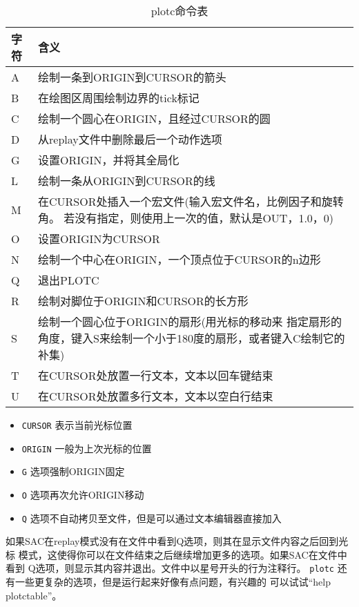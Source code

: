 \begin{table}[!ht]
\centering
\ttfamily
\small
\caption{plotc命令表}
\begin{tabular}{p{1cm}p{10cm}}
	\toprule
	字符	& 	含义	\\
	\midrule
	A		&	绘制一条到ORIGIN到CURSOR的箭头	\\
	B		&	在绘图区周围绘制边界的tick标记  \\
	C		&	绘制一个圆心在ORIGIN，且经过CURSOR的圆	\\
	D		&	从replay文件中删除最后一个动作选项	\\
	G		&	设置ORIGIN，并将其全局化	\\
	L		& 	绘制一条从ORIGIN到CURSOR的线	\\
	M		&	在CURSOR处插入一个宏文件(输入宏文件名，比例因子和旋转角。
                若没有指定，则使用上一次的值，默认是OUT，1.0，0)\\
	O		&	设置ORIGIN为CURSOR		\\
	N		&	绘制一个中心在ORIGIN，一个顶点位于CURSOR的n边形 \\
	Q		&	退出PLOTC	\\
	R		&	绘制对脚位于ORIGIN和CURSOR的长方形	\\
	S		&	绘制一个圆心位于ORIGIN的扇形(用光标的移动来
                指定扇形的角度，键入S来绘制一个小于180度的扇形，或者键入C绘制它的补集)\\
	T		&	在CURSOR处放置一行文本，文本以回车键结束	\\
	U		&	在CURSOR处放置多行文本，文本以空白行结束	\\
	\bottomrule
\end{tabular}
\end{table}
\begin{itemize}
\item \texttt{CURSOR} 表示当前光标位置
\item \texttt{ORIGIN} 一般为上次光标的位置
\item \texttt{G} 选项强制ORIGIN固定
\item \texttt{O} 选项再次允许ORIGIN移动
\item \texttt{Q} 选项不自动拷贝至文件，但是可以通过文本编辑器直接加入
\end{itemize}
如果SAC在replay模式没有在文件中看到Q选项，则其在显示文件内容之后回到光标
模式，这使得你可以在文件结束之后继续增加更多的选项。如果SAC在文件中看到
Q选项，则显示其内容并退出。文件中以星号开头的行为注释行。
\texttt{plotc} 还有一些更复杂的选项，但是运行起来好像有点问题，有兴趣的
可以试试``help plotctable''。
